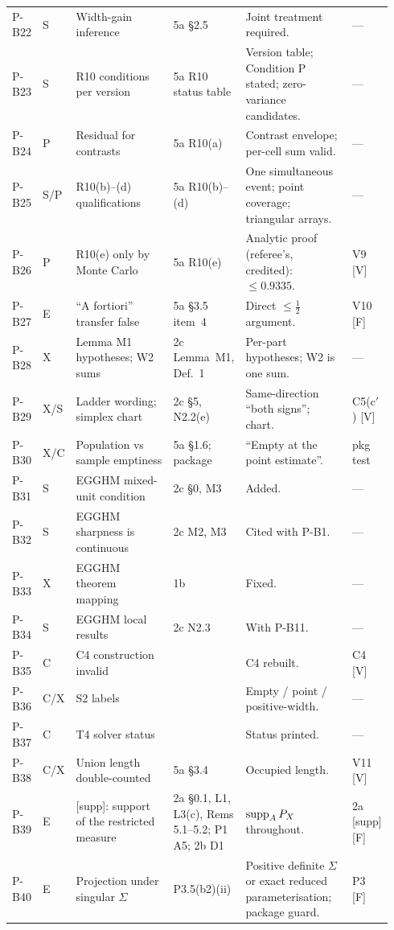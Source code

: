 {\begin{longtable}{@{}L{0.06\linewidth}L{0.03\linewidth}L{0.30\linewidth}L{0.17\linewidth}L{0.30\linewidth}L{0.08\linewidth}@{}}
P-B22 & S & Width-gain inference & 5a \S2.5 & Joint treatment required. & --- \\
P-B23 & S & R10 conditions per version & 5a R10 status table & Version table; Condition P stated; zero-variance candidates. & --- \\
P-B24 & P & Residual for contrasts & 5a R10(a) & Contrast envelope; per-cell sum valid. & --- \\
P-B25 & S/P & R10(b)--(d) qualifications & 5a R10(b)--(d) & One simultaneous event; point coverage; triangular arrays. & --- \\
P-B26 & P & R10(e) only by Monte Carlo & 5a R10(e) & Analytic proof (referee's, credited): $\le0.9335$. & V9 [V] \\
P-B27 & E & ``A fortiori'' transfer false & 5a \S3.5 item~4 & Direct $\le\tfrac12$ argument. & V10 [F] \\
P-B28 & X & Lemma M1 hypotheses; W2 sums & 2c Lemma~M1, Def.~1 & Per-part hypotheses; W2 is one sum. & --- \\
P-B29 & X/S & Ladder wording; simplex chart & 2c \S5, N2.2(e) & Same-direction ``both signs''; chart. & C5(c$'$) [V] \\
P-B30 & X/C & Population vs sample emptiness & 5a \S1.6; package & ``Empty at the point estimate''. & pkg test \\
P-B31 & S & EGGHM mixed-unit condition & 2c \S0, M3 & Added. & --- \\
P-B32 & S & EGGHM sharpness is continuous & 2c M2, M3 & Cited with P-B1. & --- \\
P-B33 & X & EGGHM theorem mapping & 1b & Fixed. & --- \\
P-B34 & S & EGGHM local results & 2c N2.3 & With P-B11. & --- \\
P-B35 & C & C4 construction invalid &  & C4 rebuilt. & C4 [V] \\
P-B36 & C/X & S2 labels &  & Empty / point / positive-width. & --- \\
P-B37 & C & T4 solver status &  & Status printed. & --- \\
P-B38 & C/X & Union length double-counted & 5a \S3.4 & Occupied length. & V11 [V] \\
P-B39 & E & [supp]: support of the restricted measure & 2a \S0.1, L1, L3(c), Rems 5.1--5.2; P1 A5; 2b D1 & $\operatorname{supp}_AP_X$ throughout. & 2a [supp] [F] \\
P-B40 & E & Projection under singular $\Sigma$ & P3.5(b2)(ii) & Positive definite $\Sigma$ or exact reduced parameterisation; package guard. & P3 [F] \\

\end{longtable}}
